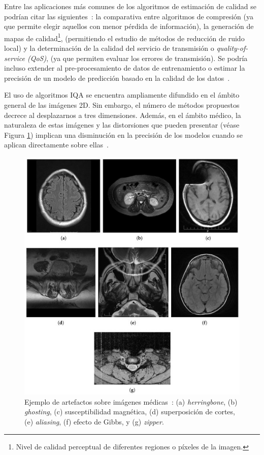 Entre las aplicaciones más comunes de los algoritmos de estimación de calidad se podrían citar las siguientes~\cite{VMAF, VMAFReproducibility, Applications}:  
la comparativa entre algoritmos de compresión (ya que permite elegir aquellos con 
menor pérdida de información), la generación de mapas de calidad\footnote{
  Nivel de calidad perceptual de diferentes regiones o píxeles de la imagen.
},
(permitiendo el estudio de métodos de reducción de ruido local)
y la determinación de la calidad del servicio de transmisión o \emph{quality-of-service (QoS)},
(ya que permiten evaluar los errores de transmisión). Se podría incluso 
extender al pre-procesamiento de datos de entrenamiento o estimar la precisión 
de un modelo de predicción basado en la calidad de los datos~\cite{ApplicationsOfIQA}.

El uso de algoritmos IQA se encuentra ampliamente difundido en el ámbito general de las imágenes 2D. 
Sin embargo, el número de métodos propuestos decrece al desplazarnos a tres dimensiones.
Además, en el ámbito médico, la naturaleza de estas imágenes y las distorsiones que pueden 
presentar (véase Figura \ref{fig:DicomDistortionsExample}) implican una disminución en 
la precisión de los modelos cuando se aplican directamente sobre ellas~\cite{VisualMedicalQualityBook}.

\begin{figure}[htp]
  \centering 
  \includegraphics[width=.7\textwidth]{imagenes/chapter2/MedicalDistortions}
  \caption[Ejemplo de artefactos sobre imágenes DICOM.]{Ejemplo de artefactos sobre imágenes médicas~\cite{MoreMedicalDistortion}: 
     (a) \emph{herringbone}, (b) \emph{ghosting}, (c) susceptibilidad magnética, (d) superposición de cortes, (e) \emph{aliasing}, (f) efecto de Gibbs, y (g) \emph{zipper}.
   }
  \label{fig:DicomDistortionsExample}
\end{figure}

